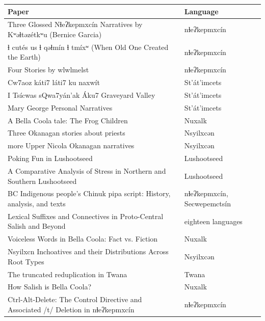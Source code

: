 \tiny
\setlength{\tabcolsep}{2pt}
\begin{longtable}{@{}>{\raggedright\arraybackslash}p{}>{\raggedright\arraybackslash}p{}@{}}
\toprule
Paper & Language \\
\midrule
Three Glossed Nɬeʔkepmxcín Narratives by Kʷəɬtəzétkʷu (Bernice Garcia) \cite{src:Garcia-Hannon-and-Stacey-2024} & nɬeʔkepmxcín \\
ɬ cutés us ɬ qəɬmín ɬ tmíxʷ (When Old One Created the Earth) \cite{src:Hall-and-Phillips-2025} & nɬeʔkepmxcín \\
Four Stories by wlwlmelst \cite{src:LaFontaine-and-Janzen-2024} & nɬeʔkepmxcín \\
Cw7aoz káti7 láti7 ku naxwít \cite{src:Matthewson-and-Redan-2026} & St'át'imcets \\
I Tsícwas sQwa7yán'ak Áku7 Graveyard Valley \cite{src:Alexander-and-Davis-2026} & St'át'imcets \\
Mary George Personal Narratives \cite{src:John-Hamilton-Davis-2021} & St'át'imcets \\
A Bella Coola tale: The Frog Children \cite{src:Nater-2015} & Nuxalk \\
Three Okanagan stories about priests \cite{src:Lyon-2015} & Nsyilxcən \\
12 more Upper Nicola Okanagan narratives \cite{src:Lindley-and-Lyon-2013} & Nsyilxcən \\
Poking Fun in Lushootseed \cite{src:Hilbert-1983} & Lushootseed \\
A Comparative Analysis of Stress in Northern and Southern Lushootseed \cite{src:Mellesmoen-and-Kye-2026} & Lushootseed \\
BC Indigenous people's Chinuk pipa script: History, analysis, and texts \cite{src:Robertson-2012} & nɬeʔkepmxcín, Secwepemctsín \\
Lexical Suffixes and Connectives in Proto-Central Salish and Beyond \cite{src:Wolfe-2025} & eighteen languages \\
Voiceless Words in Bella Coola: Fact vs. Fiction \cite{src:Nater-2024} & Nuxalk \\
Nsyilxcn Inchoatives and their Distributions Across Root Types \cite{src:Lyon-2025} & Nsyilxcən \\
The truncated reduplication in Twana \cite{src:Kim-2017} & Twana \\
How Salish is Bella Coola? \cite{src:Nater-2013} & Nuxalk \\
Ctrl-Alt-Delete: The Control Directive and Associated /t/ Deletion in nɬeʔkepmxcín \cite{src:Hall-Luntzlara-Mellesmoen-and-Reid-2026} & nɬeʔkepmxcín \\
\bottomrule
\end{longtable}
\normalsize

